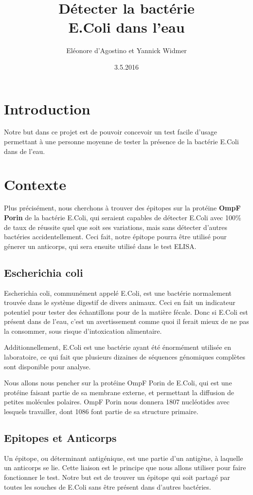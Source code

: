 \documentclass{article}
\title{Détecter la bactérie\\ {\huge E.Coli} dans l'eau}
\date{3.5.2016}
\author{Eléonore d'Agostino et Yannick Widmer}
\begin{document}
  \maketitle
  \tableofcontents
  \newpage
  \setlength{\parskip}{1em}

  \section{Introduction}
    Notre but dans ce projet est de pouvoir concevoir un test facile d'usage permettant à une personne moyenne de tester la présence de la bactérie E.Coli dans de l'eau.
  \section{Contexte}
    Plus précisément, nous cherchons à trouver des épitopes sur la protéine \textbf{OmpF Porin} de la bactérie E.Coli, qui seraient capables de détecter E.Coli avec 100\% de taux de réussite quel que soit ses variations, mais sans détecter d'autres bactéries accidentellement. Ceci fait, notre épitope pourra être utilisé pour génerer un anticorps, qui sera ensuite utilisé dans le test ELISA.

    \subsection{Escherichia coli}
      Escherichia coli, communément appelé E.Coli, est une bactérie normalement trouvée dans le système digestif de divers animaux. Ceci en fait un indicateur potentiel pour tester des échantillons pour de la matière fécale. Donc si E.Coli est présent dans de l'eau, c'est un avertissement comme quoi il ferait mieux de ne pas la consommer, sous risque d'intoxication alimentaire.

      Additionnellement, E.Coli est une bactérie ayant été énormément utilisée en laboratoire, ce qui fait que plusieurs dizaines de séquences génomiques complètes sont disponible pour analyse. \cite{ec:genome}

      Nous allons nous pencher sur la protéine OmpF Porin de E.Coli, qui est une protéine faisant partie de sa membrane externe, et permettant la diffusion de petites molécules polaires. OmpF Porin nous donnera 1807 nucléotides avec lesquels travailler, dont 1086 font partie de sa structure primaire. \cite{ompfp}

    \subsection{Epitopes et Anticorps}
      Un épitope, ou déterminant antigénique, est une partie d'un antigène, à laquelle un anticorps se lie. Cette liaison est le principe que nous allons utiliser pour faire fonctionner le test. Notre but est de trouver un épitope qui soit partagé par toutes les souches de E.Coli sans être présent dans d'autres bactéries.
\end{document}
